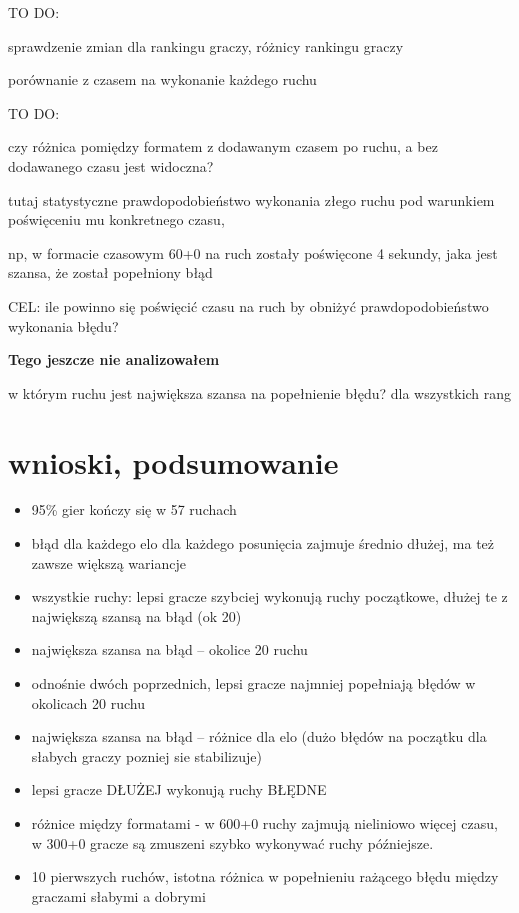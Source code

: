 \documentclass[inzynierska]{pwr_wmat_praca_dyplomowa}
\theoremstyle{plain}
\numberwithin{theorem}{chapter}
\theoremstyle{definition}
\numberwithin{theorem}{chapter}
\begin{document}
TO DO: 

sprawdzenie zmian dla rankingu graczy, różnicy rankingu graczy

porównanie z czasem na wykonanie każdego ruchu\newline



TO DO: 

czy różnica pomiędzy formatem z dodawanym czasem po ruchu, a bez dodawanego czasu jest widoczna?




tutaj statystyczne prawdopodobieństwo wykonania złego ruchu pod warunkiem poświęceniu mu konkretnego czasu,\newline

np, w formacie czasowym 60+0 na ruch zostały poświęcone 4 sekundy, jaka jest szansa, że został popełniony błąd \newline


CEL: 
ile powinno się poświęcić czasu na ruch by obniżyć prawdopodobieństwo wykonania błędu?\newline


\textbf{Tego jeszcze nie analizowałem}



w którym ruchu jest największa szansa na popełnienie błędu?
dla wszystkich rang


\chapter{wnioski, podsumowanie}
\begin{itemize}
	\item 95\% gier kończy się w 57 ruchach
	\item błąd dla każdego elo dla każdego posunięcia zajmuje średnio dłużej, ma też zawsze większą wariancje
	\item wszystkie ruchy: lepsi gracze szybciej wykonują ruchy początkowe, dłużej te z największą szansą na błąd (ok 20)
	\item największa szansa na błąd -- okolice 20 ruchu
	\item odnośnie dwóch poprzednich, lepsi gracze najmniej popełniają błędów w okolicach 20 ruchu
	\item największa szansa na błąd -- różnice dla elo (dużo błędów na początku 
	dla słabych graczy pozniej sie stabilizuje)
	\item lepsi gracze DŁUŻEJ wykonują ruchy BŁĘDNE
	\item różnice między formatami - w 600+0 ruchy zajmują nieliniowo więcej czasu, w 300+0 gracze są zmuszeni szybko wykonywać ruchy późniejsze.
	\item 10 pierwszych ruchów, istotna różnica w popełnieniu rażącego błędu między graczami słabymi a dobrymi
\end{itemize}
\end{document}

